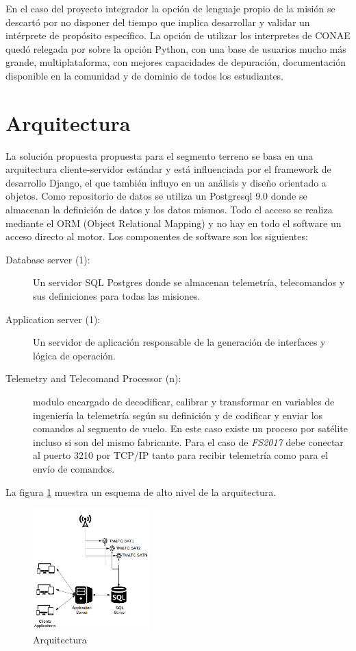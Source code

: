 \documentclass[twoside,twocolumn]{article}
\begin{document}
En el caso del proyecto integrador la opción de lenguaje propio de la misión se descartó por no disponer del tiempo que implica desarrollar y validar un intérprete de propósito específico. La opción de utilizar los interpretes de CONAE quedó relegada por sobre la opción Python, con una base de usuarios mucho más grande, multiplataforma, con mejores capacidades de depuración, documentación disponible en la comunidad y de dominio de todos los estudiantes. 




\section{Arquitectura}
La solución propuesta propuesta para el segmento terreno se basa en una arquitectura cliente-servidor estándar y está influenciada por el framework de desarrollo Django, el que también influyo en un análisis y diseño orientado a objetos. Como repositorio de datos se utiliza un Postgresql 9.0 donde se almacenan la definición de datos y los datos mismos. Todo el acceso se realiza mediante el ORM (Object Relational Mapping) y no hay en todo el software un acceso directo al motor. Los componentes de software son los siguientes:

\begin{description}
 \item [Database server (1): ] Un servidor SQL Postgres donde se almacenan telemetría, telecomandos y sus definiciones para todas las misiones.  
 \item [Application server (1): ] Un servidor de aplicación responsable de la generación de interfaces y lógica de operación.
 \item [Telemetry and Telecomand Processor (n): ] modulo encargado de decodificar, calibrar y transformar en variables de ingeniería la telemetría según su definición y de codificar y enviar los comandos al segmento de vuelo. En este caso existe un proceso por satélite incluso si son del mismo fabricante. Para el caso de \textit{FS2017} debe conectar al puerto 3210 por TCP/IP tanto para recibir telemetría como para el envío de comandos.
\end{description}

La figura \ref{fig:Arq01} muestra un esquema de alto nivel de la arquitectura.

\begin{figure}[]
  \caption{Arquitectura}
  \label{fig:Arq01}
  \centering
  \includegraphics[width=0.4\textwidth]{Imagenes/Arq01.png}
\end{figure}
\end{document}
